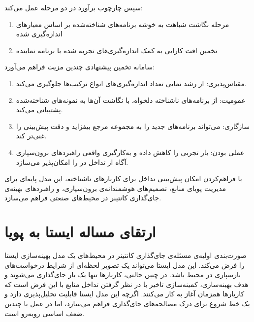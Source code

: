 سپس چارچوب برآورد در دو مرحله عمل می‌کند:

\begin{enumerate}
\item
مرحله نگاشت شباهت به خوشه برنامه‌های شناخته‌شده بر اساس معیارهای اندازه‌گیری شده

\item
تخمین افت کارایی به کمک اندازه‌گیری‌های تجربه شده با برنامه نماینده
\end{enumerate}

سامانه تخمین پیشنهادی چندین مزیت فراهم می‌آورد:

\begin{enumerate}
\item
مقیاس‌پذیری: از رشد نمایی تعداد اندازه‌گیری‌های انواع ترکیب‌ها جلوگیری می‌کند.

\item
عمومیت: از برنامه‌های ناشناخته دلخواه، با نگاشت آن‌ها به نمونه‌های شناخته‌شده پشتیبانی می‌کند.

\item
سازگاری: می‌تواند برنامه‌های جدید را به مجموعه مرجع بیفزاید و دقت پیش‌بینی را غنی‌تر کند.

\item
عملی بودن: بار تجربی را کاهش داده و به‌کارگیری واقعی راهبردهای برون‌سپاری آگاه از تداخل در  را امکان‌پذیر می‌سازد.
\end{enumerate}

با فراهم‌کردن امکان پیش‌بینی تداخل برای کاربارهای ناشناخته، این مدل پایه‌ای برای مدیریت پویای منابع، تصمیم‌های هوشمندانه‌ی برون‌سپاری، و راهبردهای بهینه‌ی جای‌گذاری کانتینر در محیط‌های صنعتی  فراهم می‌سازد.

\section{ارتقای مساله ایستا به پویا}

صورت‌بندی اولیه‌ی مسئله‌ی جای‌گذاری کانتینر در محیط‌های  یک مدل بهینه‌سازی ایستا را فرض می‌کند. این مدل ایستا می‌تواند یک تصویر لحظه‌ای از شرایط درخواست‌های بارسپاری در محیط  باشد. در چنین حالتی، کاربارها تنها یک بار جای‌گذاری می‌شوند و هدف بهینه‌سازی، کمینه‌سازی تاخیر با در نظر گرفتن تداخل منابع با این فرض است که کاربارها همزمان آغاز به کار می‌کنند. اگرچه این مدل ایستا قابلیت تحلیل‌پذیری دارد و یک خط شروع برای درک مصالحه‌های جای‌گذاری فراهم می‌سازد، اما در عمل با چندین ضعف اساسی روبه‌رو است.

